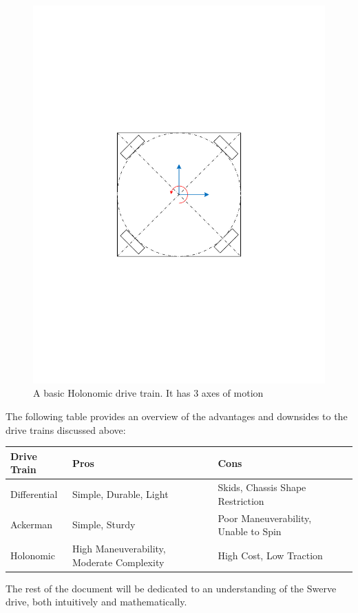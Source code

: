 \documentclass[a4paper]{article}
\begin{document}
\begin{figure}[h]%
\begin{center}
\includegraphics[scale=0.6]{Diagrams/HolonomicDrive.pdf}
\end{center}
\caption{A basic Holonomic drive train. It has 3 axes of motion}%
\label{HolDrive}%
\end{figure}
The following table provides an overview of the advantages and downsides to the drive trains discussed above: \newline \newline
\begin{tabular}{l|*{3}{l}}
Drive Train				& Pros & Cons \\
\hline
Differential 		& Simple, Durable, Light 		& Skids, Chassis Shape Restriction \\
Ackerman 				& Simple, Sturdy 						& Poor Maneuverability, Unable to Spin \\
Holonomic 			& High Maneuverability, Moderate Complexity		& High Cost, Low Traction 
\end{tabular}
\newline \newline \newline
The rest of the document will be dedicated to an understanding of the Swerve drive, both intuitively and mathematically. 
\end{document}

